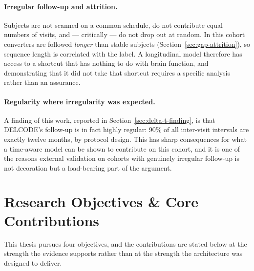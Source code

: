 \paragraph{Irregular follow-up and attrition.} Subjects are not scanned on a common
schedule, do not contribute equal numbers of visits, and --- critically --- do not drop out
at random. In this cohort converters are followed \emph{longer} than stable subjects
(Section~\ref{sec:gap-attrition}), so sequence length is correlated with the label. A
longitudinal model therefore has access to a shortcut that has nothing to do with brain
function, and demonstrating that it did not take that shortcut requires a specific analysis
rather than an assurance.

\paragraph{Regularity where irregularity was expected.} A finding of this work, reported in
Section~\ref{sec:delta-t-finding}, is that DELCODE's follow-up is in fact highly regular:
90\% of all inter-visit intervals are exactly twelve months, by protocol design. This has
sharp consequences for what a time-aware model can be shown to contribute on this cohort,
and it is one of the reasons external validation on cohorts with genuinely irregular
follow-up is not decoration but a load-bearing part of the argument.

\section{Research Objectives \& Core Contributions}
\label{sec:contributions}

This thesis pursues four objectives, and the contributions are stated below at the strength
the evidence supports rather than at the strength the architecture was designed to deliver.

